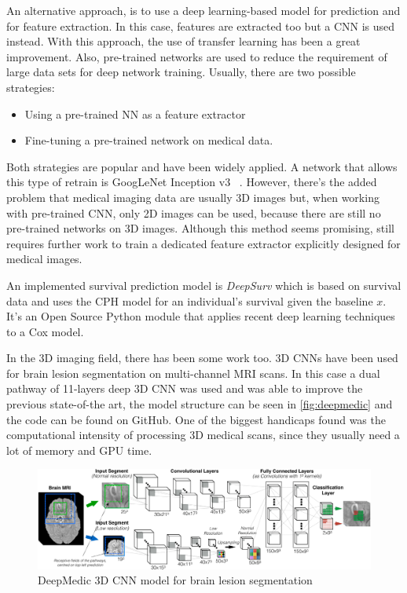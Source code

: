 An alternative approach, is to use a deep learning-based model for prediction and for feature
extraction. In this case, features are extracted too but a \gls{CNN} 
is used instead. With this approach, the use of transfer learning has been a
great improvement. Also, pre-trained networks are used to reduce the requirement of large data
sets for deep network training. Usually, there are two possible strategies: 
\begin{itemize}[noitemsep, topsep=0pt]
  \item Using a pre-trained NN as a feature extractor
  \item Fine-tuning a pre-trained network on medical data.
\end{itemize}

Both strategies are popular and have been widely applied. A network that allows this type
of retrain is GoogLeNet Inception v3
~\cites{neural:goog-le-net}{neural:retrain}{neural:inception-retrain}.
However, there's the added problem that medical imaging data are usually 3D images but, 
when working with pre-trained \gls{CNN}, only 2D images can be used, because there are still no 
pre-trained networks on 3D images. Although this method seems promising, still requires 
further work to train a dedicated feature extractor explicitly designed for medical images.
~\cite{medical:deep-learning-radiomics-gbm}

An implemented survival prediction model is \emph{DeepSurv} which is based on survival data
and uses the \gls{CPH} model for an individual's survival given the \gls{baseline}
\( x \). It's an Open Source Python module that applies recent deep learning techniques 
to a Cox model.
~\cites{medical:deep-surv}{medical:cox}

In the 3D imaging field, there has been some work too. 3D \glspl{CNN} have
been used for brain lesion segmentation on multi-channel \gls{MRI} scans. In this case a 
dual pathway of 11-layers deep 3D \gls{CNN} was used and was able to improve the previous
state-of-the art, the model structure can be seen in \autoref{fig:deepmedic} and the code 
can be found on GitHub. 
One of the biggest handicaps found was the computational intensity of
processing 3D medical scans, since they usually need a lot of memory and GPU time.
~\cites{neural:deepmedic}{neural:3d-cnn-crf}

\begin{figure}
  \centering
  \includegraphics[width=\textwidth]{images/deepmedic}

  \caption{DeepMedic 3D \acrshort{CNN} model for brain lesion segmentation \cite{neural:3d-cnn-crf}
  \label{fig:deepmedic}
  }
\end{figure}

